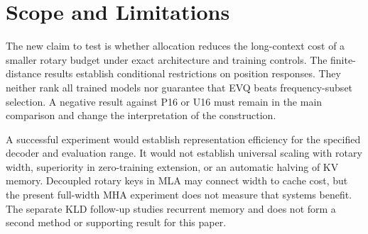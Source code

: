 \section{Scope and Limitations}
\label{sec:discussion}

The new claim to test is whether allocation reduces the long-context cost of a
smaller rotary budget under exact architecture and training controls. The
finite-distance results establish conditional restrictions on position
responses. They neither rank all trained models nor guarantee that EVQ beats
frequency-subset selection. A negative result against P16 or U16 must remain
in the main comparison and change the interpretation of the construction.

A successful experiment would establish representation efficiency for the
specified decoder and evaluation range. It would not establish universal
scaling with rotary width, superiority in zero-training extension, or an
automatic halving of KV memory. Decoupled rotary keys in MLA may connect width
to cache cost, but the present full-width MHA experiment does not measure that
systems benefit. The separate KLD follow-up studies recurrent memory and does
not form a second method or supporting result for this paper.
